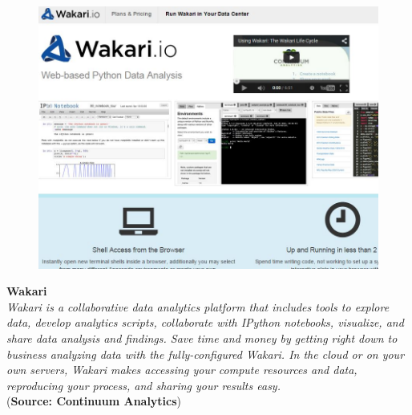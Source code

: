 \documentclass[MASTER.tex]{subfiles}
\begin{document}
\begin{frame}
	\begin{figure}
\centering
\includegraphics[width=1.1\linewidth]{wakarisite}

\end{figure}

\end{frame}
\begin{frame}
\Large
\textbf{Wakari}\\
\textit{
Wakari is a collaborative data analytics platform that includes tools to explore data, develop analytics scripts, collaborate with IPython notebooks, visualize, and share data analysis and findings. Save time and money by getting right down to business analyzing data with the fully-configured Wakari. In the cloud or on your own servers, Wakari makes accessing your compute resources and data, reproducing your process, and sharing your results easy.}\\(\textbf{Source: Continuum Analytics})
\end{frame}
\end{document}
